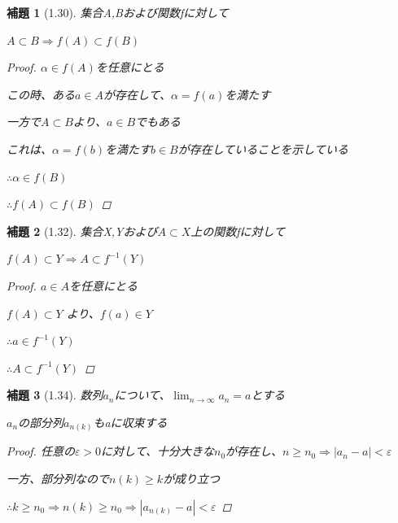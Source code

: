 \documentclass{book}
\newtheorem*{lemma}{補題}
\begin{document}
\begin{lemma}[1.30]
  集合A,Bおよび関数fに対して

  $A \subset B \Rightarrow f(A) \subset f(B)$

  \begin{proof}
    $\alpha \in f(A)$を任意にとる

    この時、ある$a \in A$が存在して、$\alpha = f(a)$を満たす

    一方で$A \subset B$より、$a \in B$でもある

    これは、$\alpha = f(b)$を満たす$b \in B$が存在していることを示している

    $\therefore \alpha \in f(B)$

    $\therefore f(A) \subset f(B)$
  \end{proof}
\end{lemma}

\begin{lemma}[1.32]
  集合X,Yおよび$A \subset X$上の関数fに対して

  $f(A) \subset Y \Rightarrow A \subset f^{-1}(Y)$

  \begin{proof}
    $a \in A$を任意にとる

    $f(A) \subset Y$ より、$f(a) \in Y$

    $\therefore a \in f^{-1}(Y)$

    $\therefore A \subset f^{-1}(Y)$
  \end{proof}
\end{lemma}

\begin{lemma}[1.34]
  数列$a_n$について、$\lim_{n \to \infty} a_n = a$とする

  $a_n$の部分列$a_{n(k)}$もaに収束する

  \begin{proof}
    任意の$\varepsilon  > 0$に対して、十分大きな$n_0$が存在し、$n \geq n_0 \Rightarrow |a_n
    - a| < \varepsilon $

    一方、部分列なので$n(k) \geq k$が成り立つ

    $\therefore k \geq n_0 \Rightarrow n(k) \geq n_0 \Rightarrow
    |a_{n(k)} - a| < \varepsilon $
  \end{proof}
\end{lemma}
\end{document}
